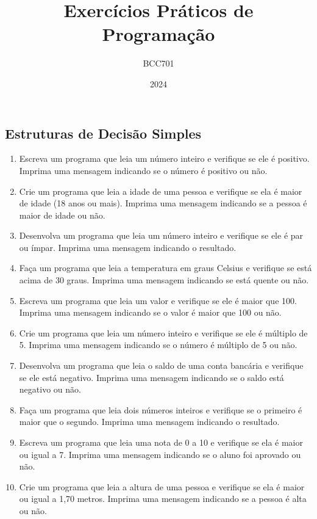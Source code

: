 \documentclass{article}
\title{Exercícios Práticos de Programação}
\author{BCC701}
\date{2024}
\begin{document}
\maketitle

\subsection*{Estruturas de Decisão Simples}

\begin{enumerate}
    \item Escreva um programa que leia um número inteiro e verifique se ele é positivo. Imprima uma mensagem indicando se o número é positivo ou não.
    
    \item Crie um programa que leia a idade de uma pessoa e verifique se ela é maior de idade (18 anos ou mais). Imprima uma mensagem indicando se a pessoa é maior de idade ou não.
    
    \item Desenvolva um programa que leia um número inteiro e verifique se ele é par ou ímpar. Imprima uma mensagem indicando o resultado.
    
    \item Faça um programa que leia a temperatura em graus Celsius e verifique se está acima de 30 graus. Imprima uma mensagem indicando se está quente ou não.
    
    \item Escreva um programa que leia um valor e verifique se ele é maior que 100. Imprima uma mensagem indicando se o valor é maior que 100 ou não.
    
    \item Crie um programa que leia um número inteiro e verifique se ele é múltiplo de 5. Imprima uma mensagem indicando se o número é múltiplo de 5 ou não.
    
    \item Desenvolva um programa que leia o saldo de uma conta bancária e verifique se ele está negativo. Imprima uma mensagem indicando se o saldo está negativo ou não.
    
    \item Faça um programa que leia dois números inteiros e verifique se o primeiro é maior que o segundo. Imprima uma mensagem indicando o resultado.
    
    \item Escreva um programa que leia uma nota de 0 a 10 e verifique se ela é maior ou igual a 7. Imprima uma mensagem indicando se o aluno foi aprovado ou não.
    
    \item Crie um programa que leia a altura de uma pessoa e verifique se ela é maior ou igual a 1,70 metros. Imprima uma mensagem indicando se a pessoa é alta ou não.
\end{enumerate}
\end{document}
